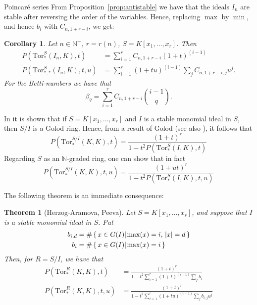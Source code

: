 \documentclass[reqno,10pt]{amsart}
\newcommand{\Tor}{\mathrm{Tor}}
\theoremstyle{definition}
\theoremstyle{remark}
\theoremstyle{plain}
\newtheorem{theorem}[definition]{Theorem}
\newtheorem{corr}[definition]{Corollary}
\newcommand{\Nat}{{\mathbb{N}}}
\def\setsuchas#1#2{\left\{\,{#1}\,\vrule\,{#2}\,\right\}}
\newcommand{\tdeg}[1]{\vert#1\rvert}
\begin{document}
\begin{section}{Poincar{\'e} series}
From Proposition~\ref{prop:antistable} we have that the ideals \(I_n\)
are stable after reversing the order of
the variables. Hence, replacing \(\max\) by \(\min\), 
and hence \(b_i\) with \(C_{n,1+r-i}\), we get: 

\begin{corr}
  Let \(n \in \Nat^+\), \(r=r(n)\), \(S=K[x_1,\dots,x_r]\). Then
    \begin{align}
      P(\Tor_{*}^{S}(I_n,K),t) &= \sum_{i=1}^r C_{n,1+r-i} (1+t)^{(i-1)} \\
      P(\Tor_{*,*}^{S}(I_n,K),t,u) &= \sum_{i=1}^r (1+tu)^{(i-1)} \sum_j
      C_{n,1+r-i,j} u^{j}.       
    \end{align}
  For the Betti-numbers we have that
  \begin{equation}
    \beta_q = \sum_{i=1}^r C_{n,1+r-i} \binom{i-1}{q}.
  \end{equation}
\end{corr}

In \cite{Peeva:Stable, KoszulEliKer} it is shown that if
\(S=K[x_1,\dots,x_r]\) and \(I\) is a stable monomial ideal in \(S\),
then \(S/I\) is a Golod ring. Hence, from a
result of Golod \cite{Golod:Res} (see also \cite{GullLev}), it follows
that 
\begin{equation}
  \label{eqn:golod}
  P(\Tor_{*}^{S/I}(K,K),t) = \frac{(1+t)^r}{1- t^2 P(\Tor_{*}^{S}(I,K),t)}
\end{equation}
Regarding \(S\) as an \(\Nat\)-graded ring, one can show that in fact
\begin{equation}
  \label{eqn:golodGrad}
  P(\Tor_{*}^{S/I}(K,K),t,u) = \frac{(1+ut)^r}{1- t^2 P(\Tor_{*}^{S}(I,K),t,u)}
\end{equation}

The following theorem is an immediate consequence:
\begin{theorem}[Herzog-Aramova, Peeva]
  \label{thm:pbs}
  Let \(S=K[x_1,\dots,x_r]\), and suppose that \(I\) is a stable
  monomial ideal in \(S\). 
    Put 
    \begin{displaymath}
      \begin{split}
        b_{i,d} &= \# \setsuchas{x \in G(I)}{\max(x)=i, \, \tdeg{x}=d} \\
        b_i &= \# \setsuchas{x \in G(I)}{\max(x)=i} 
      \end{split}
    \end{displaymath}
    Then, for \(R=S/I\), we have that 
    \begin{align}
      P(\Tor_{*}^{R}(K,K),t) &= 
      \frac{(1+t)^r}{1- t^2 \sum_{i=1}^r (1+t)^{(i-1)} \sum_j b_i } \\
      P(\Tor_{*}^{R}(K,K),t,u) &= 
      \frac{(1+t)^r}{1- t^2 \sum_{i=1}^r (1+tu)^{(i-1)} \sum_j b_{i,j} u^{j}}
  \end{align}
\end{theorem}


\end{section}
\end{document}
